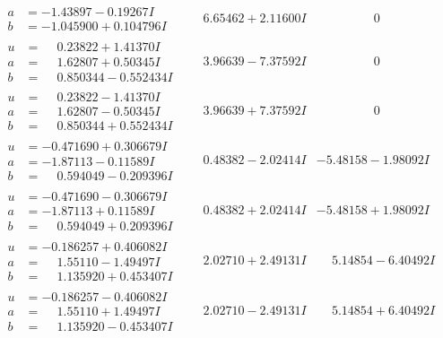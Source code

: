 \documentclass[1p]{elsarticle_modified}
\theoremstyle{definition}
\begin{document}
$$\begin{array}{c|c|c}
\begin{aligned}
a &= -1.43897 - 0.19267 I \\
b &= -1.045900 + 0.104796 I\end{aligned}
 & \phantom{-}6.65462 + 2.11600 I & \phantom{-0.000000 } 0 \\ \hline\begin{aligned}
u &= \phantom{-}0.23822 + 1.41370 I \\
a &= \phantom{-}1.62807 + 0.50345 I \\
b &= \phantom{-}0.850344 - 0.552434 I\end{aligned}
 & \phantom{-}3.96639 - 7.37592 I & \phantom{-0.000000 } 0 \\ \hline\begin{aligned}
u &= \phantom{-}0.23822 - 1.41370 I \\
a &= \phantom{-}1.62807 - 0.50345 I \\
b &= \phantom{-}0.850344 + 0.552434 I\end{aligned}
 & \phantom{-}3.96639 + 7.37592 I & \phantom{-0.000000 } 0 \\ \hline\begin{aligned}
u &= -0.471690 + 0.306679 I \\
a &= -1.87113 - 0.11589 I \\
b &= \phantom{-}0.594049 - 0.209396 I\end{aligned}
 & \phantom{-}0.48382 - 2.02414 I & -5.48158 - 1.98092 I \\ \hline\begin{aligned}
u &= -0.471690 - 0.306679 I \\
a &= -1.87113 + 0.11589 I \\
b &= \phantom{-}0.594049 + 0.209396 I\end{aligned}
 & \phantom{-}0.48382 + 2.02414 I & -5.48158 + 1.98092 I \\ \hline\begin{aligned}
u &= -0.186257 + 0.406082 I \\
a &= \phantom{-}1.55110 - 1.49497 I \\
b &= \phantom{-}1.135920 + 0.453407 I\end{aligned}
 & \phantom{-}2.02710 + 2.49131 I & \phantom{-}5.14854 - 6.40492 I \\ \hline\begin{aligned}
u &= -0.186257 - 0.406082 I \\
a &= \phantom{-}1.55110 + 1.49497 I \\
b &= \phantom{-}1.135920 - 0.453407 I\end{aligned}
 & \phantom{-}2.02710 - 2.49131 I & \phantom{-}5.14854 + 6.40492 I \\ \hline\begin{aligned}

\end{aligned}
\end{array}$$
\end{document}
